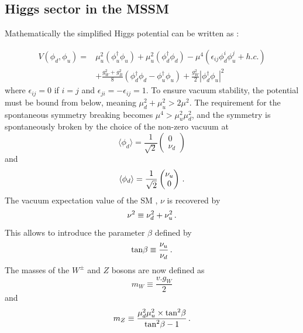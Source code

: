 \subsection{Higgs sector in the MSSM}

Mathematically the simplified Higgs potential can be written as \cite{Nagashima:2014tva}:

\begin{align}
    V(\phi_d , \phi_u) = & \mu^{2}_u (\phi^{\dagger}_u \phi_u) + \mu^{2}_u (\phi^{\dagger}_d \phi_d) - \mu^{4}(\epsilon_{ij}\phi^{i}_d \phi^{j}_u + h.c.) \\ & + \frac{g^{2}_W + g^{2}_B}{8}(\phi^{\dagger}_d \phi_d - \phi^{\dagger}_u \phi_u) + \frac{g^{2}_W}{2} | \phi^{\dagger}_d \phi_u |^2
\end{align}
where $\epsilon_{ij} = 0$ if $i = j$ and $\epsilon_{ji} = -\epsilon_{ij} = 1$. To ensure vacuum stability, the potential must be bound from below, meaning $\mu_{d}^2 + \mu_{u}^2 > 2\mu^2$. The requirement for the spontaneous symmetry breaking becomes $\mu^4 > \mu_{u}^2 \mu_{d}^2$, and the symmetry is spontaneously broken by the choice of the non-zero vacuum at
\begin{equation}
    \langle \phi_d \rangle = \frac{1}{\sqrt{2}} \begin{pmatrix} 0 \\ \nu_d \end{pmatrix}
\end{equation}
and
\begin{equation}
    \langle \phi_d \rangle = \frac{1}{\sqrt{2}} \begin{pmatrix} \nu_u \\ 0 \end{pmatrix} \mend
\end{equation}
The vacuum expectation value of the SM , $\nu$ is recovered by
\begin{equation}
    \nu^2 \equiv \nu_{d}^2 + \nu_{u}^2 \mend
\end{equation}
This allows to introduce the parameter $\beta$ defined by 
\begin{equation}
    \mathrm{tan} \beta \equiv \frac{\nu_u}{\nu_d} \mend
\end{equation}
The masses of the $W^{\pm}$ and $Z$ bosons are now defined as 
\begin{equation}
    m_W \equiv \frac{v.g_W}{2}
\end{equation}
and
\begin{equation}
    m_Z \equiv \frac{\mu_{d}^2 \mu_{u}^2 \times \mathrm{tan}^2 \beta}{\mathrm{tan}^2 \beta - 1} \mend
\end{equation}

